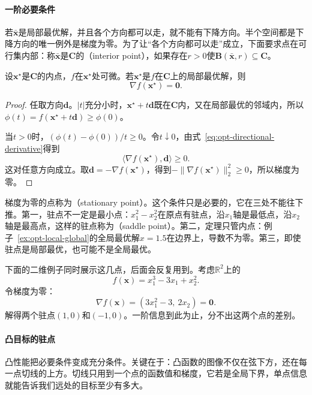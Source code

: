 \paragraph{一阶必要条件}
若$\bar{\bm{x}}$是局部最优解，并且各个方向都可以走，就不能有下降方向。半个空间都是下降方向的唯一例外是梯度为零。为了让“各个方向都可以走”成立，下面要求点在可行集内部：称$\bar{\bm{x}}$是$\bm{C}$的（interior point），如果存在$r>0$使$\bm{B}(\bar{\bm{x}},r)\subseteq\bm{C}$。

\begin{theorem}[一阶必要条件]
\label{thm:opt-first-order}
设$\bm{x}^\star$是$\bm{C}$的内点，$f$在$\bm{x}^\star$处可微。若$\bm{x}^\star$是$f$在$\bm{C}$上的局部最优解，则
\begin{equation}
 \nabla f(\bm{x}^\star)=\bm{0}.
 \label{eq:opt-first-order}
\end{equation}
\end{theorem}

\begin{proof}
任取方向$\bm{d}$。$\lvert t\rvert$充分小时，$\bm{x}^\star+t\bm{d}$既在$\bm{C}$内，又在局部最优的邻域内，所以$\phi(t)=f(\bm{x}^\star+t\bm{d})\geq\phi(0)$。

当$t>0$时，$(\phi(t)-\phi(0))/t\geq0$。令$t\downarrow0$，由式~\eqref{eq:opt-directional-derivative}得到
\[
 \langle\nabla f(\bm{x}^\star),\bm{d}\rangle\geq0.
\]
这对任意方向成立。取$\bm{d}=-\nabla f(\bm{x}^\star)$，得到$-\lVert\nabla f(\bm{x}^\star)\rVert_2^2\geq0$，所以梯度为零。
\end{proof}

梯度为零的点称为（stationary point）。这个条件只是必要的，它在三处不能往下推。第一，驻点不一定是最小点：$x_1^2-x_2^2$在原点有驻点，沿$x_1$轴是最低点，沿$x_2$轴是最高点，这样的驻点称为（saddle point）。第二，定理只管内点：例子~\ref{ex:opt-local-global}的全局最优解$x=1.5$在边界上，导数不为零。第三，即使驻点是局部最优，也可能不是全局最优。

下面的二维例子同时展示这几点，后面会反复用到。考虑$\mathbb{R}^2$上的
\begin{equation}
 f(\bm{x})=x_1^3-3x_1+x_2^2.
 \label{eq:opt-cubic}
\end{equation}
令梯度为零：
\[
 \nabla f(\bm{x})=(3x_1^2-3,\ 2x_2)=\bm{0}.
\]
解得两个驻点$(1,0)$和$(-1,0)$。一阶信息到此为止，分不出这两个点的差别。

\paragraph{凸目标的驻点}
凸性能把必要条件变成充分条件。关键在于：凸函数的图像不仅在弦下方，还在每一点切线的上方。切线只用到一个点的函数值和梯度，它若是全局下界，单点信息就能告诉我们远处的目标至少有多大。

